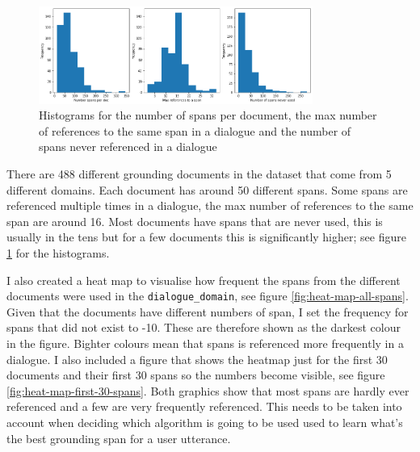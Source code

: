 \documentclass[11pt]{article}
\begin{document}
    \begin{figure}[h]
        \centering
        \includegraphics[width=0.8\textwidth]{span_counts}
        \caption{Histograms for the number of spans per document, the max number of references to the same span in a dialogue and the number of
        spans never referenced in a dialogue }
        \label{fig:histogram-spans}
    \end{figure}

    There are 488 different grounding documents in the dataset that come from 5 different domains. Each document has
    around 50 different spans. Some spans are referenced multiple times in a dialogue, the max number of references
    to the same span are around 16. Most documents have spans that are never used, this is usually in the tens but for a few documents
    this is significantly higher; see figure \ref{fig:histogram-spans} for the histograms.

    I also created a heat map to visualise how frequent the spans from the different documents were used in the \texttt{dialogue\_domain},
    see figure \ref{fig:heat-map-all-spans}. Given that the documents have different numbers of span, I set the frequency for spans that did not exist to -10. These
    are therefore shown as the darkest colour in the figure. Bighter colours mean that spans is referenced more frequently in a
    dialogue. I also included a figure that shows the heatmap just for the first 30 documents and their first 30 spans
    so the numbers become visible, see figure \ref{fig:heat-map-first-30-spans}. Both graphics show that most spans
    are hardly ever referenced and a few are very frequently referenced. This needs to be taken into account when
    deciding which algorithm is going to be used used to learn what's the best grounding span for a user utterance.
\end{document}
